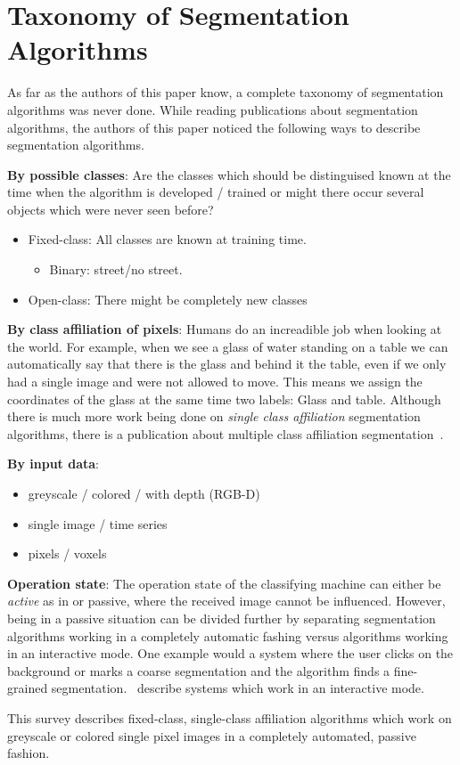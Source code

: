 \section{Taxonomy of Segmentation Algorithms}\label{sec:taxonomy}
As far as the authors of this paper know, a complete taxonomy of segmentation
algorithms was never done. While reading publications about segmentation
algorithms, the authors of this paper noticed the following ways to describe
segmentation algorithms.

\textbf{By possible classes}: Are the classes which should be distinguised
known at the time when the algorithm is developed / trained or might there
occur several objects which were never seen before?
\begin{itemize}
    \item Fixed-class: All classes are known at training time.
          \begin{itemize}
              \item Binary: street/no street.
          \end{itemize}
    \item Open-class: There might be completely new classes
\end{itemize}

\textbf{By class affiliation of pixels}: Humans do an increadible job when
looking at the world. For example, when we see a glass of water standing on a
table we can automatically say that there is the glass and behind it the table,
even if we only had a single image and were not allowed to move. This means we
assign the coordinates of the glass at the same time two labels: Glass and
table. Although there is much more work being done on \textit{single class
affiliation} segmentation algorithms, there is a publication about multiple
class affiliation segmentation~\cite{levin2008spectral}.

\textbf{By input data}:
\begin{itemize}
    \item greyscale / colored / with depth (RGB-D)
    \item single image / time series
    \item pixels / voxels \cite{wolz2012multi}
\end{itemize}

\textbf{Operation state}: The operation state of the classifying machine can
either be \textit{active} as in
\cite{schiebener2011segmentation,schiebener2012discovery} or passive, where the
received image cannot be influenced. However, being in a passive situation can
be divided further by separating segmentation algorithms working in a
completely automatic fashing versus algorithms working in an interactive mode.
One example would a system where the user clicks on the background or marks a
coarse segmentation and the algorithm finds a fine-grained segmentation.
\cite{protiere2007interactive,rother2004grabcut}~describe systems which work
in an interactive mode.

This survey describes fixed-class, single-class affiliation algorithms which
work on greyscale or colored single pixel images in a completely automated,
passive fashion.
